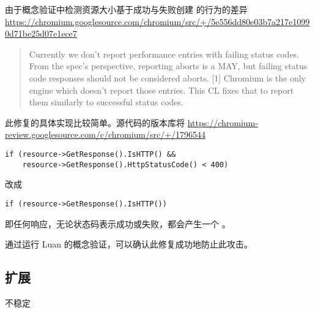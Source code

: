 由于概念验证中检测资源大小基于成功与失败创建  的行为的差异 \url{https://chromium.googlesource.com/chromium/src/+/5e556dd80e03b7a217e10990d71be25d07e1ece7}

\begin{quote}
    Currently we don't report performance entries with failing status codes.
    From the spec's perspective, reporting aborts is a MAY, but failing
    status code responses should not be considered aborts. [1]
    Chromium is the only engine which doesn't report those entries.
    This CL fixes that to report them similarly to successful status codes.
\end{quote}

此修复的具体实现比较简单。源代码的版本库将 \url{https://chromium-review.googlesource.com/c/chromium/src/+/1796544}

\begin{lstlisting}
if (resource->GetResponse().IsHTTP() &&
    resource->GetResponse().HttpStatusCode() < 400)
\end{lstlisting}

改成 

\begin{lstlisting}
if (resource->GetResponse().IsHTTP())
\end{lstlisting}


即任何响应，无论状态码表示成功或失败，都会产生一个 。


通过运行 Luan 的概念验证，可以确认此修复成功地防止此攻击。

\subsection{扩展}

不稳定